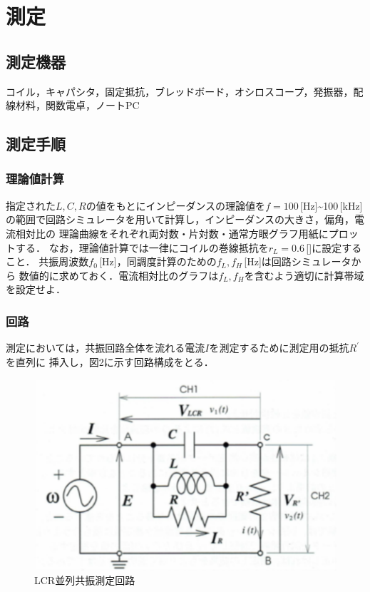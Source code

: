 
\section{測定}

\subsection*{測定機器}
コイル，キャパシタ，固定抵抗，ブレッドボード，オシロスコープ，発振器，配線材料，関数電卓，ノートPC

\subsection*{測定手順}
\subsubsection*{理論値計算}
指定された$L,C,R$の値をもとにインピーダンスの理論値を$f = 100$\,[Hz]\sim 100\,[kHz]
の範囲で回路シミュレータを用いて計算し，インピーダンスの大きさ，偏角，電流相対比の
理論曲線をそれぞれ両対数・片対数・通常方眼グラフ用紙にプロットする．
なお，理論値計算では一律にコイルの巻線抵抗を$r_L = 0.6$\,[\Omega]に設定すること．
共振周波数$f_0$\,[Hz]，同調度計算のための$f_L,f_H$\,[Hz]は回路シミュレータから
数値的に求めておく．電流相対比のグラフは$f_L,f_H$を含むよう適切に計算帯域を設定せよ．

\subsubsection*{回路}
測定においては，共振回路全体を流れる電流$I$を測定するために測定用の抵抗$R^{\prime}$を直列に
挿入し，図2に示す回路構成をとる．

\begin{figure}[H]
    \begin{center}
        \includegraphics[]{figure2.pdf}
        \caption{LCR並列共振測定回路}
    \end{center}
\end{figure}

